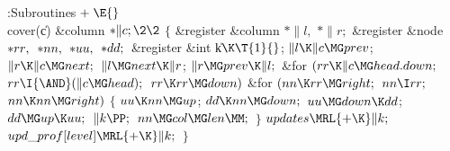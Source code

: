 \Y\B\4:Subroutines\X${}\mathrel+\E{}$\6
\\{cover}(\|c)\1\1\6
\&{column} ${}{*}\|c;\2\2{}$\6
${}\{{}$\5
\1\&{register} \&{column} ${}{*}\|l,{}$ ${}{*}\|r;{}$\6
\&{register} \&{node} ${}{*}\\{rr},{}$ ${}{*}\\{nn},{}$ ${}{*}\\{uu},{}$ ${}{*}%
\\{dd};{}$\6
\&{register} \&{int} \|k${}\K\T{1}{}$;\7
${}\|l\K\|c\MG\\{prev}{}$;\5
${}\|r\K\|c\MG\\{next};{}$\6
${}\|l\MG\\{next}\K\|r{}$;\5
${}\|r\MG\\{prev}\K\|l;{}$\6
\&{for} ${}(\\{rr}\K\|c\MG\\{head}.\\{down};{}$ ${}\\{rr}\I{\AND}(\|c\MG%
\\{head});{}$ ${}\\{rr}\K\\{rr}\MG\\{down}){}$\1\6
\&{for} ${}(\\{nn}\K\\{rr}\MG\\{right};{}$ ${}\\{nn}\I\\{rr};{}$ ${}\\{nn}\K%
\\{nn}\MG\\{right}){}$\5
${}\{{}$\1\6
${}\\{uu}\K\\{nn}\MG\\{up}{}$;\5
${}\\{dd}\K\\{nn}\MG\\{down};{}$\6
${}\\{uu}\MG\\{down}\K\\{dd}{}$;\5
${}\\{dd}\MG\\{up}\K\\{uu};{}$\6
${}\|k\PP;{}$\6
${}\\{nn}\MG\\{col}\MG\\{len}\MM;{}$\6
\4${}\}{}$\2\2\6
${}\\{updates}\MRL{+{\K}}\|k;{}$\6
${}\\{upd\_prof}[\\{level}]\MRL{+{\K}}\|k;{}$\6
\4${}\}{}$\2\par
\fi

